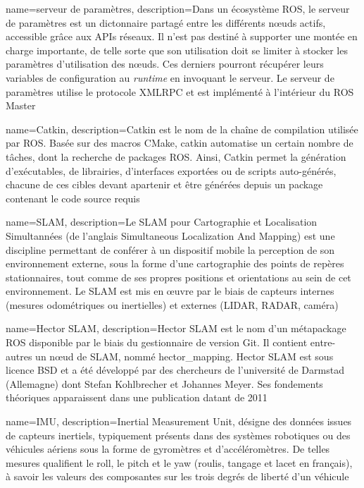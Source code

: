 {
  name={serveur de paramètres},
    description={Dans un écosystème \gls{ROS}, le serveur de paramètres est un dictonnaire partagé entre les différents n\oe{}uds actifs, accessible grâce aux APIs réseaux. 
    Il n'est pas destiné à supporter une montée en charge importante, de telle sorte que son utilisation doit se limiter à stocker les paramètres d'utilisation des n\oe{}uds. 
    Ces derniers pourront récupérer leurs variables de configuration au \emph{runtime} en invoquant le serveur.
    Le serveur de paramètres utilise le protocole \gls{XMLRPC} et est implémenté à l'intérieur du ROS Master}
}

{
  name={Catkin},
    description={Catkin est le nom de la chaîne de compilation utilisée par ROS. 
    Basée sur des macros CMake, catkin automatise un certain nombre de tâches, dont la recherche de packages ROS. 
    Ainsi, Catkin permet la génération d'exécutables, de librairies, d'interfaces exportées ou de scripts auto-générés, 
    chacune de ces cibles devant apartenir et être générées depuis un package contenant le code source requis}
}

{
  name={SLAM},
    description={Le SLAM pour Cartographie et Localisation Simultannées (de l'anglais Simultaneous Localization And Mapping) est une discipline permettant 
    de conférer à un dispositif mobile la perception de son environnement externe, sous la forme d'une cartographie des points de repères stationnaires, tout comme de ses 
    propres positions et orientations au sein de cet environnement. 
    Le SLAM est mis en \oe{}uvre par le biais de capteurs internes (mesures odométriques ou inertielles) et externes (LIDAR, RADAR, caméra)}
}

{
  name={Hector SLAM},
    description={Hector SLAM est le nom d'un métapackage ROS disponible par le biais du gestionnaire de version Git. 
    Il contient entre-autres un n\oe{}ud de SLAM, nommé hector\_mapping. Hector SLAM est sous licence BSD et a été développé par des chercheurs de l'université de Darmstad (Allemagne) dont 
    Stefan Kohlbrecher et Johannes Meyer. Ses fondements théoriques apparaissent dans une publication datant de 2011\cite{Bib_Hector_SLAM}}
}

{
  name={IMU},
    description={Inertial Measurement Unit, désigne des données issues de capteurs inertiels, typiquement présents dans des systèmes robotiques ou des véhicules aériens sous la forme de gyromètres et d'accéléromètres.
    De telles mesures qualifient le roll, le pitch et le yaw (roulis, tangage et lacet en français), à savoir les valeurs des composantes sur les trois degrés de liberté d'un véhicule}
}

